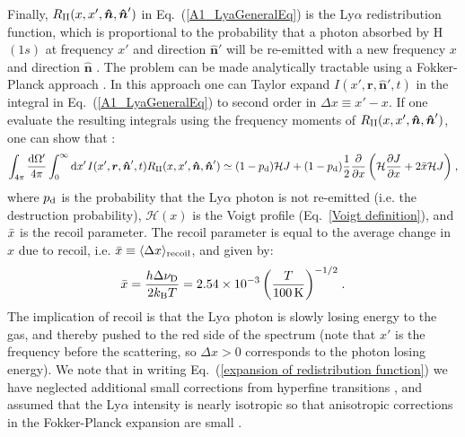 \documentclass[fleqn,usenatbib]{mnras}
\begin{document}
Finally, $R_{\rm II}(x, x',\boldsymbol{\hat{n}}, \boldsymbol{\hat{n}}')$ in Eq.~(\ref{A1_LyaGeneralEq}) is the Ly$\alpha$ redistribution function, which is proportional to the probability that a photon absorbed by H$(1s)$ at frequency $x'$ and direction $\boldsymbol{\hat{n}}'$ will be re-emitted with a new frequency $x$ and direction $\boldsymbol{\hat{n}}$ \citep[for explicit expressions, see e.g.][]{Hummer1962, Smith2018_discretediffusion}. The problem can be made analytically tractable using a Fokker-Planck approach \citep[e.g.][]{Unno1955, Harrington1973, Rybicki1994, Chuzhoy2006, Meiksin2006, Rybicki2006, McClellan2022}. In this approach one can Taylor expand $I(x', \boldsymbol{r}, \boldsymbol{\hat{n}}', t)$ in the integral in Eq.~(\ref{A1_LyaGeneralEq}) to second order in $\Delta x \equiv x' - x$. If one evaluate the resulting integrals using the frequency moments of $R_{\rm II}(x, x',\boldsymbol{\hat{n}}, \boldsymbol{\hat{n}}')$, one can show that \citep[see e.g.][]{Rybicki1994, Chuzhoy2006, Rybicki2006, McClellan2022}:
\begin{equation}
    \int_{4\pi} \dfrac{\textrm{d}\Omega'}{4 \pi}  \int_{0}^{\infty} \textrm{d}x' \hspace{1 pt}  I(x', \boldsymbol{r}, \boldsymbol{\hat{n}}', t) R_{\rm II}(x, x',\boldsymbol{\hat{n}}, \boldsymbol{\hat{n}}') \simeq (1-p_{\rm d}) \mathcal{H}J+  (1-p_{\rm d}) \dfrac{1}{2} \dfrac{\partial}{\partial x} \left( \mathcal{H} \dfrac{\partial J}{\partial x} + 2 \Bar{x} \mathcal{H} J \right) \hspace{1 pt} \label{expansion of redistribution function}, 
\end{equation}
where $p_{\rm d}$ is the probability that the Ly$\alpha$ photon is not re-emitted (i.e. the destruction probability), $\mathcal{H}(x)$ is the Voigt profile (Eq.~\ref{Voigt definition}), and $\Bar{x}$ is the recoil parameter. The recoil parameter is equal to the average change in $x$ due to recoil, i.e. $\Bar{x} \equiv \langle \Delta x \rangle_{\rm recoil}$, and given by:
\begin{equation}
    \Bar{x} = \dfrac{h \Delta \nu_{\rm D}}{2 k_{\rm B} T} = 2.54 \times 10^{-3} \left( \dfrac{T}{100\,\rm K} \right)^{-1/2} \hspace{1 pt}.
\end{equation}
The implication of recoil is that the Ly$\alpha$ photon is slowly losing energy to the gas, and thereby pushed to the red side of the spectrum (note that $x'$ is the frequency before the scattering, so $\Delta x > 0$ corresponds to the photon losing energy). We note that in writing Eq.~(\ref{expansion of redistribution function}) we have neglected additional small corrections from hyperfine transitions \citep{Chuzhoy2006}, and assumed that the Ly$\alpha$ intensity is nearly isotropic so that anisotropic corrections in the Fokker-Planck expansion are small \citep{Rybicki1994, McClellan2022}. 
\end{document}
